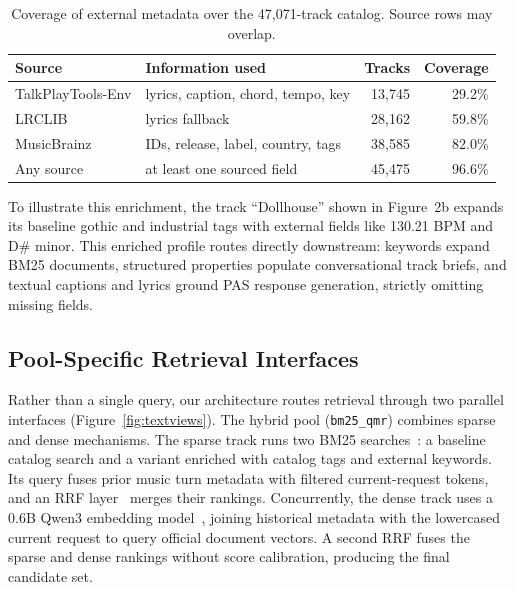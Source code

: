 \begin{table}[h]
  \caption{Coverage of external metadata over the 47,071-track catalog.
  Source rows may overlap.}
  \label{tab:metadata}
  \centering
  \scriptsize
  \setlength{\tabcolsep}{2.5pt}
  \begin{tabular}{@{}lp{2.85cm}rr@{}}
    \toprule
    Source & Information used & Tracks & Coverage \\
    \midrule
    TalkPlayTools-Env & lyrics, caption, chord, tempo, key & 13,745 & 29.2\% \\
    LRCLIB & lyrics fallback & 28,162 & 59.8\% \\
    MusicBrainz & IDs, release, label, country, tags & 38,585 & 82.0\% \\
    Any source & at least one sourced field & 45,475 & 96.6\% \\
    \bottomrule
  \end{tabular}
\end{table}

To illustrate this enrichment, the track ``Dollhouse'' shown in Figure~2b expands its baseline gothic and industrial tags with external fields like 130.21 BPM and D\# minor. This enriched profile routes directly downstream: keywords expand BM25 documents, structured properties populate conversational track briefs, and textual captions and lyrics ground PAS response generation, strictly omitting missing fields.

\subsection{Pool-Specific Retrieval Interfaces}

Rather than a single query, our architecture routes retrieval through two parallel interfaces (Figure~\ref{fig:textviews}). The hybrid pool (\texttt{bm25\_qmr}) combines sparse and dense mechanisms. The sparse track runs two BM25 searches~\cite{robertson1994okapi}: a baseline catalog search and a variant enriched with catalog tags and external keywords. Its query fuses prior music turn metadata with filtered current-request tokens, and an RRF layer~\cite{cormack2009rrf} merges their rankings. Concurrently, the dense track uses a 0.6B Qwen3 embedding model~\cite{qwen3embedding2025}, joining historical metadata with the lowercased current request to query official document vectors. A second RRF fuses the sparse and dense rankings without score calibration, producing the final candidate set.


